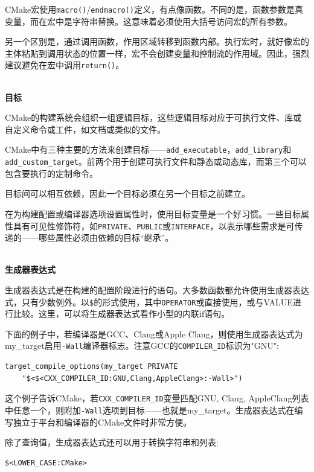 CMake宏使用\texttt{macro()}/\texttt{endmacro()}定义，有点像函数。不同的是，函数参数是真变量，而在宏中是字符串替换。这意味着必须使用大括号访问宏的所有参数。

另一个区别是，通过调用函数，作用区域转移到函数内部。执行宏时，就好像宏的主体粘贴到调用状态的位置一样，宏不会创建变量和控制流的作用域。因此，强烈建议避免在宏中调用\texttt{return()}。

\hspace*{\fill} \\ %
\noindent
\textbf{目标}

CMake的构建系统会组织一组逻辑目标，这些逻辑目标对应于可执行文件、库或自定义命令或工件，如文档或类似的文件。

CMake中有三种主要的方法来创建目标——\texttt{add\_executable}，\texttt{add\_library}和\texttt{add\_custom\_target}。前两个用于创建可执行文件和静态或动态库，而第三个可以包含要执行的定制命令。

目标间可以相互依赖，因此一个目标必须在另一个目标之前建立。

在为构建配置或编译器选项设置属性时，使用目标变量是一个好习惯。一些目标属性具有可见性修饰符，如\texttt{PRIVATE}、\texttt{PUBLIC}或\texttt{INTERFACE}，以表示哪些需求是可传递的——哪些属性必须由依赖的目标“继承”。


\hspace*{\fill} \\ %
\noindent
\textbf{生成器表达式}

生成器表达式是在构建的配置阶段进行的语句。大多数函数都允许使用生成器表达式，只有少数例外。以\texttt{\$<OPERATOR:VALUE>}的形式使用，其中\texttt{OPERATOR}或直接使用，或与VALUE进行比较。这里，可以将生成器表达式看作小型的内联if语句。

下面的例子中，若编译器是GCC、Clang或Apple Clang，则使用生成器表达式为my\_target启用\texttt{-Wall}编译器标志。注意GCC的\texttt{COMPILER\_ID}标识为"GNU":

\begin{lstlisting}[style=styleCMake]
target_compile_options(my_target PRIVATE
	"$<$<CXX_COMPILER_ID:GNU,Clang,AppleClang>:-Wall>")
\end{lstlisting}

这个例子告诉CMake，若\texttt{CXX\_COMPILER\_ID}变量匹配GNU, Clang, AppleClang列表中任意一个，则附加\texttt{-Wall}选项到目标——也就是my\_target。生成器表达式在编写独立于平台和编译器的CMake文件时非常方便。

除了查询值，生成器表达式还可以用于转换字符串和列表:

\begin{lstlisting}[style=styleCMake]
$<LOWER_CASE:CMake>
\end{lstlisting}


